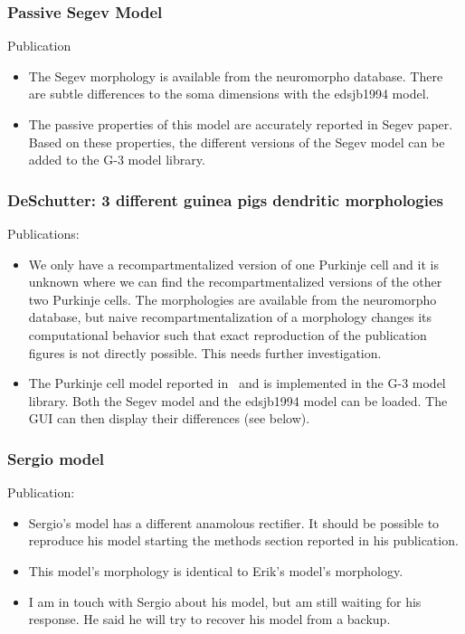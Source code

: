 \documentclass[12pt]{article}
\begin{document}
\subsubsection{Passive Segev Model}

Publication~\cite{Rapp-P:1994qf}

\begin{itemize}
\item The Segev morphology is available from the
  neuromorpho database.  There are subtle differences to the soma
  dimensions with the edsjb1994 model.
\item The passive properties of this model are accurately reported in
  Segev paper.  Based on these properties, the different versions of
  the Segev model can be added to the G-3 model library.
\end{itemize}


\subsubsection{DeSchutter: 3 different guinea pigs dendritic
  morphologies}

Publications:~\cite{deschutter94:_purkin_i}\cite{deschutter94:_purkin_ii}

\begin{itemize}
\item We only have a recompartmentalized version of one Purkinje cell
  and it is unknown where we can find the recompartmentalized versions
  of the other two Purkinje cells.  The morphologies are available
  from the neuromorpho database, but naive recompartmentalization of a
  morphology changes its computational behavior such that exact
  reproduction of the publication figures is not directly possible.
  This needs further investigation.
\item The Purkinje cell model reported
  in~\cite{deschutter94:_purkin_i} and \cite{deschutter94:_purkin_ii}
  is implemented in the G-3 model library.  Both the Segev model and
  the edsjb1994 model can be loaded.  The GUI can then display their
  differences (see below).
\end{itemize}


\subsubsection{Sergio model}

Publication:~\cite{solinas06:_dendr_purkin}

\begin{itemize}
\item Sergio's model has a different anamolous rectifier.  It should
  be possible to reproduce his model starting the methods section
  reported in his publication.
\item This model's morphology is identical to Erik's model's
  morphology.
\item I am in touch with Sergio about his model, but am still waiting
  for his response.  He said he will try to recover his model from a
  backup.
\end{itemize}
\end{document}
